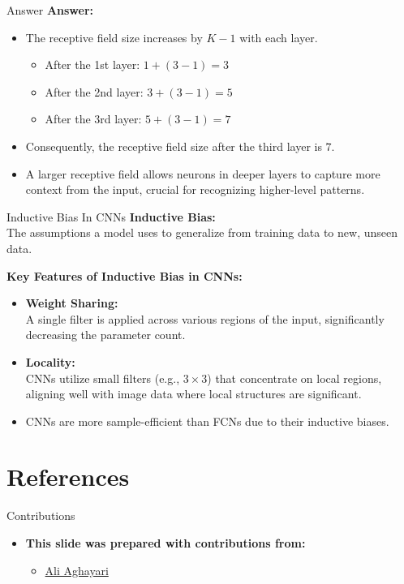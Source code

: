 \documentclass[default, aspectratio=169]{beamer}
\begin{document}
	\begin{frame}{Answer}
		\textbf{Answer:}
		\begin{itemize}
			\item The receptive field size increases by \( K - 1 \) with each layer.
			\begin{itemize}
				\item After the 1st layer: \( 1 + (3 - 1) = 3 \)
				\item After the 2nd layer: \( 3 + (3 - 1) = 5 \)
				\item After the 3rd layer: \( 5 + (3 - 1) = 7 \)
			\end{itemize}
			\item Consequently, the receptive field size after the third layer is \( 7 \).
			\item A larger receptive field allows neurons in deeper layers to capture more context from the input, crucial for recognizing higher-level patterns.
		\end{itemize}
	\end{frame}
	\begin{frame}{Inductive Bias In CNNs}
		\textbf{Inductive Bias:} \\
		The assumptions a model uses to generalize from training data to new, unseen data.
		
		\bigskip
		\textbf{Key Features of Inductive Bias in CNNs:}
		\begin{itemize}
			\item \textbf{Weight Sharing:} \\
			A single filter is applied across various regions of the input, significantly decreasing the parameter count.
			
			\item \textbf{Locality:} \\
			CNNs utilize small filters (e.g., $3 \times 3$) that concentrate on local regions, aligning well with image data where local structures are significant.
			
			\item CNNs are more sample-efficient than FCNs due to their inductive biases.
		\end{itemize}
	\end{frame}
	
	
	\section{References}
	\begin{frame}{Contributions}
		\begin{itemize}
			\item \textbf{This slide was prepared with contributions from:}
			\begin{itemize}
				\setlength{\itemsep}{10pt}
				\item \href{https://github.com/Ali0281}{Ali Aghayari}
			\end{itemize}
		\end{itemize}
		
	\end{frame}
	
	\begin{frame}[allowframebreaks]
		
		
		\nocite{*}
	\end{frame}
	
	
\end{document}
